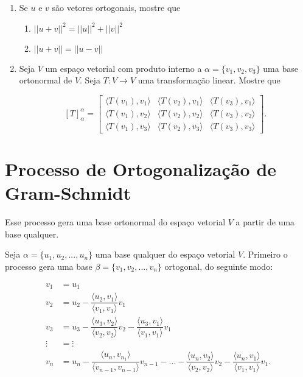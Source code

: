 \begin{enumerate}
\item Se $u$ e $v$ são vetores ortogonais, mostre que
\begin{enumerate}
\item $||u+v||^2=||u||^2+||v||^2$
\item $||u+v||=||u-v||$
\end{enumerate}

\item Seja $V$ um espaço vetorial com produto interno a $\alpha = \{v_1, v_2, v_3 \}$ uma base ortonormal de $V$. Seja $ T: V \rightarrow V$ uma transformação linear. Mostre que

$$ [T]_{\alpha}^{\alpha}=\left[ \begin{array}{ccc}
\langle T(v_1), v_1\rangle &\langle  T(v_2), v_1\rangle  & \langle T(v_3), v_1\rangle \\
\langle T(v_1), v_2 \rangle &\langle T(v_2), v_2 \rangle  & \langle  T(v_3), v_2\rangle \\
\langle T(v_1), v_3 \rangle &\langle T(v_2), v_3\rangle  & \langle T(v_3), v_3\rangle    \end{array} \right]. $$

\end{enumerate}

\section{Processo de Ortogonalização de Gram-Schmidt}


Esse processo gera uma base ortonormal  do espaço vetorial $V$ a partir de uma base qualquer.

Seja $ \alpha =\{u_1, u_2,...,u_n\}$ uma  base qualquer do espaço vetorial  $V$.  Primeiro o processo gera uma base  $ \beta =\{v_1, v_2,...,v_n\}$ ortogonal, do seguinte modo:

\begin{align}
v_1 &= u_1 \nonumber\\
v_2&= u_2 - \dfrac{\langle u_2, v_1 \rangle}{\langle v_1, v_1 \rangle} v_1  \nonumber\\
v_3 &= u_3 -   \dfrac{ \langle u_3, v_2 \rangle }{\langle v_2, v_2 \rangle}v_2 - \dfrac{\langle u_3, v_1 \rangle}{\langle v_1, v_1 \rangle} v_1 \nonumber\\
\vdots& = \vdots \\
v_n & = u_n -   \dfrac{ \langle u_n, v_{n_1} \rangle }{\langle v_{n-1}, v_{n-1} \rangle}v_{n-1} - ...- \dfrac{ \langle u_n, v_2 \rangle }{\langle v_2, v_2 \rangle}v_2- \dfrac{\langle u_n, v_1 \rangle}{\langle v_1, v_1 \rangle} v_1 .\nonumber
\end{align}

